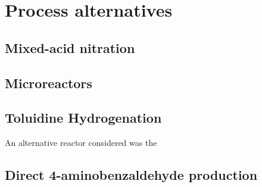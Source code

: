 \section{Process alternatives}
\label{app:alternatives}

\subsection{Mixed-acid nitration}
\label{mixed}

\subsection{Microreactors}
\label{microreactor}

\subsection{Toluidine Hydrogenation}
\label{toluidine}
An alternative reactor considered was the 


\subsection{Direct 4-aminobenzaldehyde production}
\label{direct}